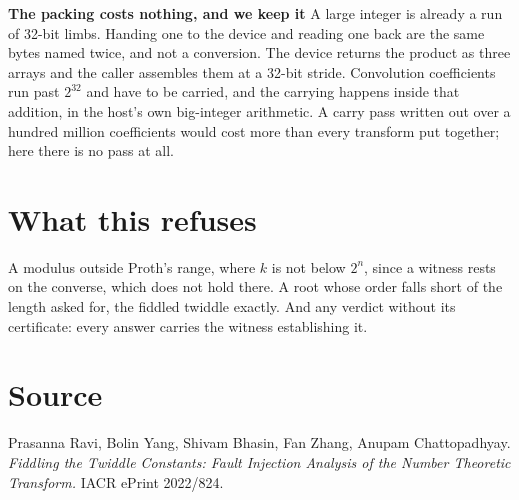 \documentclass{article}
\begin{document}
\textbf{The packing costs nothing, and we keep it} A large integer is already a run of 32-bit limbs. Handing one to the device and reading one back are the same bytes named twice, and not a conversion. The device returns the product as three arrays and the caller assembles them at a 32-bit stride. Convolution coefficients run past \(2^{32}\) and have to be carried, and the carrying happens inside that addition, in the host's own big-integer arithmetic. A carry pass written out over a hundred million coefficients would cost more than every transform put together; here there is no pass at all.

\section{What this refuses}

A modulus outside Proth's range, where \(k\) is not below \(2^n\), since a witness rests on the converse, which does not hold there. A root whose order falls short of the length asked for, the fiddled twiddle exactly. And any verdict without its certificate: every answer carries the witness establishing it.

\section{Source}

Prasanna Ravi, Bolin Yang, Shivam Bhasin, Fan Zhang, Anupam Chattopadhyay. \emph{Fiddling the Twiddle Constants: Fault Injection Analysis of the Number Theoretic Transform.} IACR ePrint 2022/824.
\end{document}
